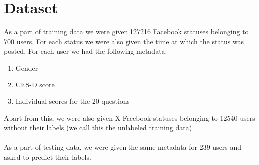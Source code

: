 \section{Dataset}
\label{sec:dataset}
As a part of training data we were given 127216 Facebook statuses belonging to 700 users. For each status we were also given the time at which the status was posted. For each user we had the following metadata:
\begin{enumerate}
\item Gender
\item CES-D score
\item Individual scores for the 20 questions
\end{enumerate}
Apart from this, we were also given  X Facebook statuses belonging to 12540 users without their labels (we call this the unlabeled training data)\\\\
As a part of testing data, we were given the same metadata for 239 users and asked to predict their labels.